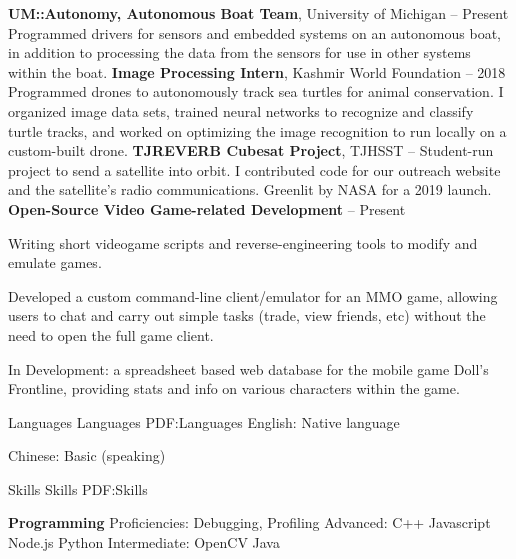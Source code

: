 \documentclass[letterpaper,MMMyyyy,nonstopmode]{style}
\begin{document}
\begin{Body}
\Entry
{\textbf{UM::Autonomy, Autonomous Boat Team}}, University of Michigan
\hfill
{} -- Present
\Gap
Programmed drivers for sensors and embedded systems on an autonomous boat, in addition to processing the data from the sensors for use in other systems within the boat.
\Gap
\Entry
{\textbf{Image Processing Intern}}, Kashmir World Foundation
\hfill
{} -- {2018}
\Gap
Programmed drones to autonomously track sea turtles for animal conservation. I organized image data sets, trained neural networks to recognize and classify turtle tracks, and worked on optimizing the image recognition to run locally on a custom-built drone.
\Gap
\Entry
{\textbf{TJREVERB Cubesat Project}}, TJHSST
\hfill
{} -- 
\Gap
Student-run project to send a satellite into orbit. I contributed code for our outreach website and the satellite's radio communications. Greenlit by NASA for a 2019 launch.
\Gap
\Entry
{\textbf{Open-Source Video Game-related Development}}
\hfill
{} -- Present
\Gap

Writing short videogame scripts and reverse-engineering tools to modify and emulate games.

Developed a custom command-line client/emulator for an MMO game, allowing users to chat and carry out simple tasks (trade, view friends, etc) without the need to open the full game client. %

In Development: a spreadsheet based web database for the mobile game Doll's Frontline, providing stats and info on various characters within the game.


\Section
{Languages}
{Languages}
{PDF:Languages}
English: Native language

Chinese: Basic (speaking)


\Section
{Skills}
{Skills}
{PDF:Skills}

\Entry
{\textbf{Programming}}
\Gap
Proficiencies: Debugging, Profiling
\Gap
Advanced:
C++ \SubBulletSymbol \space 
Javascript \SubBulletSymbol \space 
Node.js \SubBulletSymbol \space
Python
\Gap
Intermediate:
OpenCV \SubBulletSymbol \space
Java


\end{Body}
\end{document}

